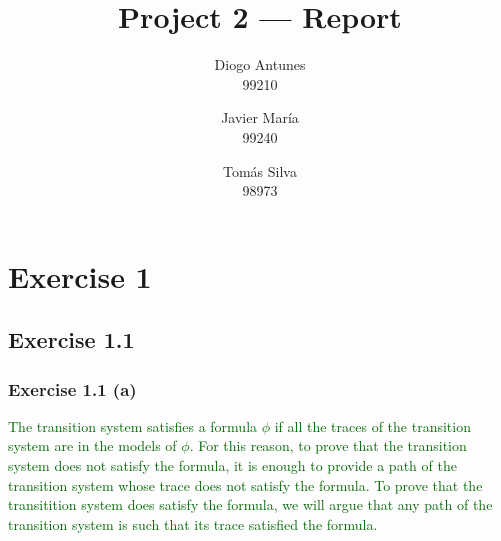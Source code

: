 \documentclass[12pt]{article}
\newcommand{\drafter}[1]{\textcolor{darkgreen}{#1}}
\begin{document}
\title{Project 2 — Report}
\author{
  Diogo Antunes\\
  99210
  \and
  Javier María\\
  99240
  \and
  Tomás Silva\\
  98973
}

\maketitle

\section*{Exercise 1}

\subsection*{Exercise 1.1}

\subsubsection*{Exercise 1.1 (a)}

\drafter{The transition system satisfies a formula $\phi$ if all the traces of the transition system are in the models of $\phi$.}
\drafter{For this reason, to prove that the transition system does not satisfy the formula, it is enough to provide a path of the transition system whose trace does not satisfy the formula.}
\drafter{To prove that the transitition system does satisfy the formula, we will argue that any path of the transition system is such that its trace satisfied the formula.}
\end{document}
